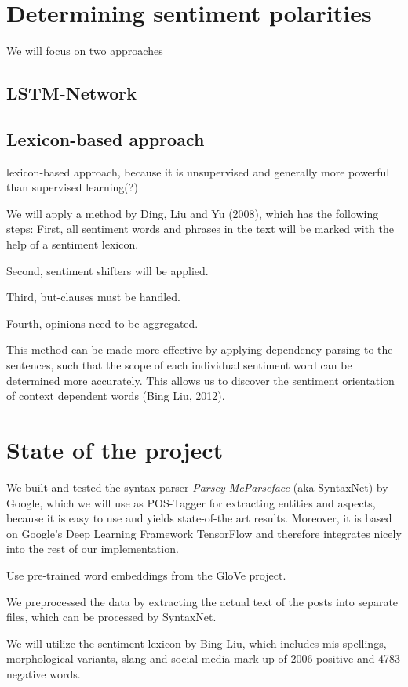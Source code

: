 \documentclass[10pt,a4paper]{article}
\begin{document}
	\section{Determining sentiment polarities}
	We will focus on two approaches
	
		\subsection{LSTM-Network}
		
		\subsection{Lexicon-based approach}
		lexicon-based approach, because it is unsupervised and generally more powerful than supervised learning(?)
		
		We will apply a method by Ding, Liu and Yu (2008), which has the following steps: First, all sentiment words and phrases in the text will be marked with the help of a sentiment lexicon.
		
		Second, sentiment shifters will be applied.
		
		Third, but-clauses must be handled.
		
		Fourth, opinions need to be aggregated.
	
		This method can be made more effective by applying dependency parsing to the sentences, such that the scope of each individual sentiment word can be determined more accurately. This allows us to discover the sentiment orientation of context dependent words (Bing Liu, 2012).

	\section{State of the project}
	We built and tested the syntax parser \textit{Parsey McParseface} (aka SyntaxNet) by Google, which we will use as POS-Tagger for extracting entities and aspects, because it is easy to use and yields state-of-the art results. Moreover, it is based on Google's Deep Learning Framework TensorFlow and therefore integrates nicely into the rest of our implementation.
	
	Use pre-trained word embeddings from the GloVe project.
	
	We preprocessed the data by extracting the actual text of the posts into separate files, which can be processed by SyntaxNet.
	
	We will utilize the sentiment lexicon by Bing Liu, which includes mis-spellings, morphological variants, slang and social-media mark-up of 2006 positive and 4783 negative words.
	
\end{document}
